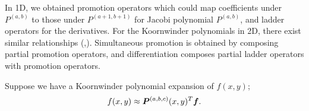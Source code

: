 \newpage
{}
In 1D, we obtained promotion operators which could map coefficients under $P^{(a,b)}$ to those under $P^{(a+1,b+1)}$ for Jacobi polynomial $P^{(a,b)}$, and ladder operators for the derivatives. For the Koornwinder polynomials in 2D, there exist similar relationships (\cite{jacladder},\cite{sparsetri}). Simultaneous promotion is obtained by composing partial promotion operators, and differentiation composes partial ladder operators with promotion operators.

Suppose we have a Koornwinder polynomial expansion of $f(x,y)$; $$f(x,y) \approx \boldsymbol{P}^{(a,b,c)}(x,y)^T\boldsymbol{f}.$$

